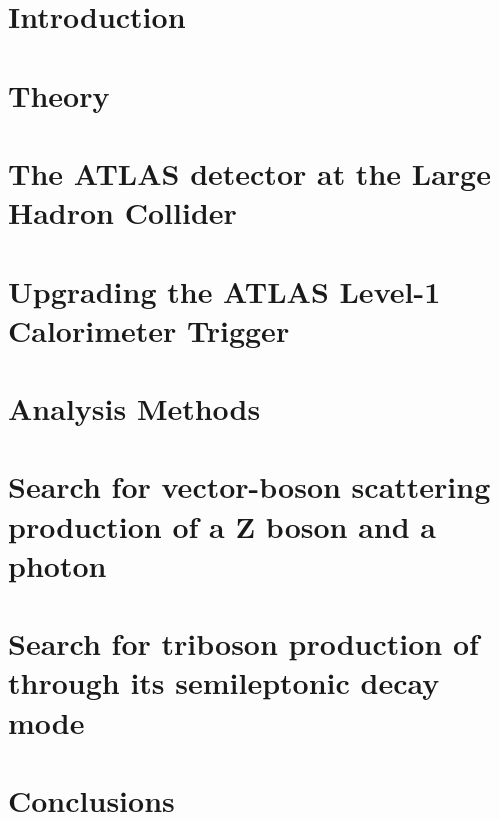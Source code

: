 \newcommand\relpath[1]{#1}
\newcommand\inputchapter[1]{}
\newcommand\resource[1]{#1}
\chapter*{Introduction}
\inputchapter{introduction}

\chapter{Theory}
\inputchapter{theory}

\chapter{The ATLAS detector at the Large Hadron Collider}
\inputchapter{detector}

\chapter{Upgrading the ATLAS Level-1 Calorimeter Trigger}
\inputchapter{l1calo}

\chapter{Analysis Methods}
\inputchapter{analysis-common}

\chapter{Search for vector-boson scattering production of a Z boson and a photon}
\inputchapter{vbs}

\chapter{Search for triboson production of \VZy through its semileptonic decay mode}
\inputchapter{vzy}

\chapter*{Conclusions}
\inputchapter{conclusion}
